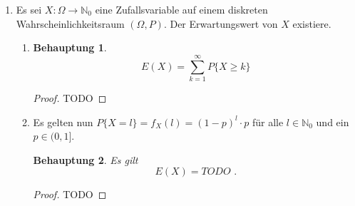 \documentclass[a4paper]{scrartcl}
\newtheorem*{behaupt}{Behauptung}
\begin{document}
\begin{enumerate}[label=\bfseries\arabic*.]
\begin{proof}
\begin{equation*}
\begin{split}
                        \frac{\lambda_1^k}{(\lambda_1 + \lambda_2)^k} \cdot
                        \frac{\lambda_2^{s-k}}{(\lambda_1 + \lambda_2)^{s-k}} \\
                    &= \binom{s}{k} \cdot
                        \left( \frac{\lambda_1}{\lambda_1 + \lambda_2} \right)^k
                        \cdot
                        \left(\frac{\lambda_2}{\lambda_1+\lambda_2}\right)^{s-k}
                        \\
                    &= \binom{s}{k} \cdot
                        \left( \frac{\lambda_1}{\lambda_1 + \lambda_2} \right)^k
                        \cdot \left(1 - \frac{\lambda_1}{\lambda_1 + \lambda_2}
                        \right)^{s-k}
                \end{split}
            \end{equation*}
        \end{proof}

    \item
        Es sei $X\colon \Omega \to \mathbb{N}_0$ eine Zufallsvariable auf einem
        diskreten Wahrscheinlichkeitsraum $(\Omega, P)$.
        Der Erwartungswert von $X$ existiere.
        \begin{enumerate}[label=(\alph*)]
            \item
                \begin{behaupt}
                    \begin{equation*}
                        E(X) = \sum_{k=1}^\infty P\{X \geq k\}
                    \end{equation*}
                \end{behaupt}
                \begin{proof}
                    TODO
                \end{proof}

            \item
                Es gelten nun $P\{X = l\} = f_X(l) = (1 - p)^l \cdot p$ für alle
                $l \in \mathbb{N}_0$ und ein $p \in (0, 1]$.
                \begin{behaupt}
                    Es gilt
                    \begin{equation*}
                        E(X) = TODO
                        \text{ .}
                    \end{equation*}
                \end{behaupt}
                \begin{proof}
                    TODO
                \end{proof}

        \end{enumerate}
\end{enumerate}
\end{document}
